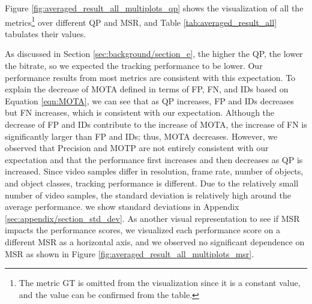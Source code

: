 Figure \ref{fig:averaged_result_all_multiplots_qp} shows the visualization of all the metrics\footnote{The metric GT is omitted from the visualization since it is a constant value, and the value can be confirmed from the table.} over different QP and MSR, and Table \ref{tab:averaged_result_all} tabulates their values.


As discussed in Section \ref{sec:background/section_e}, the higher the QP, the lower the bitrate, so we expected the tracking performance to be lower. Our performance results from most metrics are consistent with this expectation. To explain the decrease of MOTA defined in terms of FP, FN, and IDs based on Equation \eqref{eqn:MOTA}, we can see that as QP increases, FP and IDs decreases but FN increases, which is consistent with our expectation. Although the decrease of FP and IDs contribute to the increase of MOTA, the increase of FN is significantly larger than FP and IDs; thus, MOTA decreases. However, we observed that Precision and MOTP are not entirely consistent with our expectation and that the performance first increases and then decreases as QP is increased. Since video samples differ in resolution, frame rate, number of objects, and object classes, tracking performance is different. Due to the relatively small number of video samples, the standard deviation is relatively high around the average performance. we show standard deviations in Appendix \ref{sec:appendix/section_std_dev}. As another visual representation to see if MSR impacts the performance scores, we visualized each performance score on a different MSR as a horizontal axis, and we observed no significant dependence on MSR as shown in Figure \ref{fig:averaged_result_all_multiplots_msr}.




